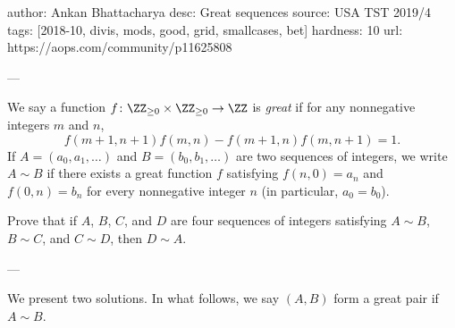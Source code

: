 author: Ankan Bhattacharya
desc: Great sequences
source: USA TST 2019/4
tags: [2018-10, divis, mods, good, grid, smallcases, bet]
hardness: 10
url: https://aops.com/community/p11625808

---

We say a function $f \colon \ZZ_{\ge 0} \times \ZZ_{\ge 0} \to \ZZ$
is \emph{great} if for any nonnegative integers $m$ and $n$,
\[ f(m+1, n+1) f(m,n) - f(m+1,n) f(m,n+1) = 1. \]
If $A = (a_0, a_1, \dots)$ and $B = (b_0, b_1, \dots)$
are two sequences of integers,
we write $A \sim B$ if there exists a great function $f$
satisfying $f(n,0) = a_n$ and $f(0,n) = b_n$
for every nonnegative integer $n$ (in particular, $a_0=b_0$).

Prove that if $A$, $B$, $C$, and $D$ are four sequences of integers
satisfying $A \sim B$, $B \sim C$, and $C \sim D$, then $D \sim A$.

---

We present two solutions.
In what follows, we say $(A, B)$ form a great pair
if $A \sim B$.


